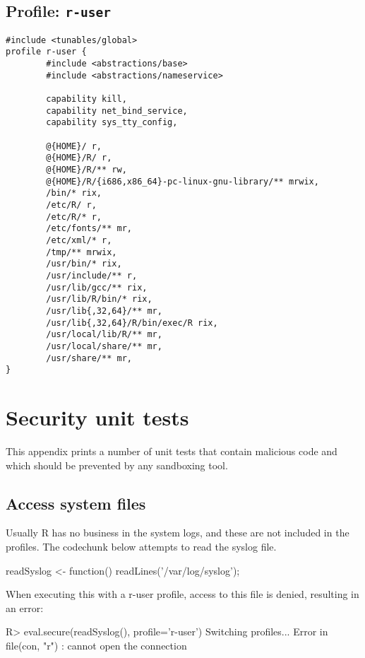 \documentclass[article]{jss}
\newcommand{\R}{\textsf{R}\xspace}
\begin{document}
\begin{appendices}
\subsection[Profile: r-user]{Profile: \texttt{r-user}}
\label{r-user}

\begin{verbatim}
#include <tunables/global>
profile r-user {
        #include <abstractions/base>
        #include <abstractions/nameservice>
	
        capability kill,
        capability net_bind_service,
        capability sys_tty_config,
	
        @{HOME}/ r,
        @{HOME}/R/ r,
        @{HOME}/R/** rw,
        @{HOME}/R/{i686,x86_64}-pc-linux-gnu-library/** mrwix,
        /bin/* rix,
        /etc/R/ r,
        /etc/R/* r,
        /etc/fonts/** mr,
        /etc/xml/* r,
        /tmp/** mrwix,
        /usr/bin/* rix,
        /usr/include/** r,
        /usr/lib/gcc/** rix,		
        /usr/lib/R/bin/* rix,
        /usr/lib{,32,64}/** mr,
        /usr/lib{,32,64}/R/bin/exec/R rix,
        /usr/local/lib/R/** mr,
        /usr/local/share/** mr,
        /usr/share/** mr,
}
\end{verbatim}



\section{Security unit tests}

This appendix prints a number of unit tests that contain malicious code and
which should be prevented by any sandboxing tool.

\subsection{Access system files}

Usually \R has no business in the system logs, and these are not included in the
profiles. The codechunk below attempts to read the syslog file.
\begin{CodeChunk}
\begin{CodeInput}
readSyslog <- function(){
	readLines('/var/log/syslog');
}
\end{CodeInput}
\end{CodeChunk}
When executing this with a r-user profile, access to this file is denied,
resulting in an error:
\begin{CodeChunk}
\begin{CodeInput}
R> eval.secure(readSyslog(), profile='r-user')
Switching profiles...
Error in file(con, "r") : cannot open the connection
\end{CodeInput}
\end{CodeChunk}


\end{appendices}
\end{document}
